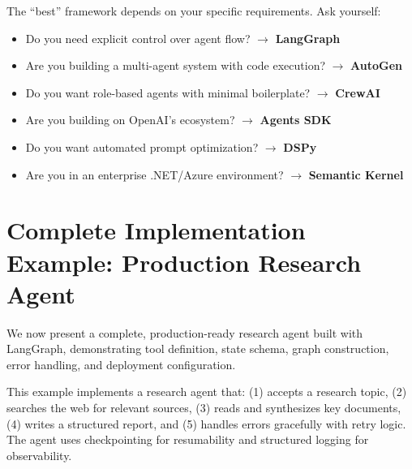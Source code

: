 \begin{questionbox}
The ``best'' framework depends on your specific requirements. Ask yourself:

\begin{itemize}
  \item Do you need explicit control over agent flow? $\to$ \textbf{LangGraph}
  \item Are you building a multi-agent system with code execution? $\to$ \textbf{AutoGen}
  \item Do you want role-based agents with minimal boilerplate? $\to$ \textbf{CrewAI}
  \item Are you building on OpenAI’s ecosystem? $\to$ \textbf{Agents SDK}
  \item Do you want automated prompt optimization? $\to$ \textbf{DSPy}
  \item Are you in an enterprise .NET/Azure environment? $\to$ \textbf{Semantic Kernel}
\end{itemize}
\end{questionbox}

\section{Complete Implementation Example: Production Research Agent}
\label{subsec:implementation-example}

We now present a complete, production-ready research agent built with LangGraph, demonstrating tool definition, state schema, graph construction, error handling, and deployment configuration.

\begin{examplebox}
This example implements a research agent that: (1) accepts a research topic, (2) searches the web for relevant sources, (3) reads and synthesizes key documents, (4) writes a structured report, and (5) handles errors gracefully with retry logic. The agent uses checkpointing for resumability and structured logging for observability.
\end{examplebox}

